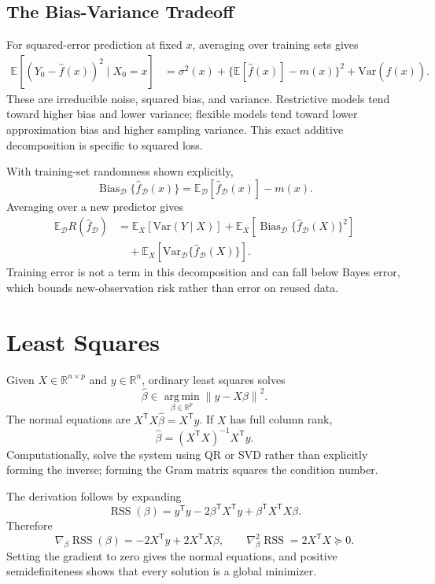 \documentclass[12pt,oneside]{book}
\numberwithin{equation}{section}
\theoremstyle{definition}
\theoremstyle{plain}
\theoremstyle{remark}
\newcommand{\R}{\mathbb{R}}
\newcommand{\E}{\mathbb{E}}
\newcommand{\Var}{\mathrm{Var}}
\newcommand{\argmin}{\operatorname*{arg\,min}}
\newcommand{\norm}[1]{\left\lVert #1 \right\rVert}
\newcommand{\grad}{\nabla}
\newcommand{\Hess}{\nabla^2}
\begin{document}
\subsection{The Bias-Variance Tradeoff}

For squared-error prediction at fixed $x$, averaging over training sets gives
\begin{align}
 \E[(Y_0-\widehat f(x))^2\mid X_0=x]
 &=\sigma^2(x)
 +\{\E[\widehat f(x)]-m(x)\}^2
 +\Var(\widehat f(x)).
 \label{eq:prediction-bias-variance}
\end{align}
These are irreducible noise, squared bias, and variance. Restrictive models
tend toward higher bias and lower variance; flexible models tend toward lower
approximation bias and higher sampling variance. This exact additive
decomposition is specific to squared loss.

With training-set randomness shown explicitly,
\[
 \operatorname{Bias}_{\mathcal D}\{\widehat f_{\mathcal D}(x)\}
 =\E_{\mathcal D}[\widehat f_{\mathcal D}(x)]-m(x).
\]
Averaging over a new predictor gives
\begin{align*}
 \E_{\mathcal D}R(\widehat f_{\mathcal D})
 &=\E_X[\Var(Y\mid X)]
 +\E_X[\operatorname{Bias}_{\mathcal D}
       \{\widehat f_{\mathcal D}(X)\}^2]\\
 &\quad+\E_X[\Var_{\mathcal D}
       \{\widehat f_{\mathcal D}(X)\}].
\end{align*}
Training error is not a term in this decomposition and can fall below Bayes
error, which bounds new-observation risk rather than error on reused data.

\section{Least Squares}

Given $X\in\R^{n\times p}$ and $y\in\R^n$, ordinary least squares solves
\begin{equation}
    \widehat\beta\in\argmin_{\beta\in\R^p}\norm{y-X\beta}^2.
    \label{eq:ols-objective}
\end{equation}
The normal equations are
$X^\mathsf TX\widehat\beta=X^\mathsf Ty$. If $X$ has full column rank,
\[
    \widehat\beta=(X^\mathsf TX)^{-1}X^\mathsf Ty.
\]
Computationally, solve the system using QR or SVD rather than explicitly
forming the inverse; forming the Gram matrix squares the condition number.

The derivation follows by expanding
\[
 \operatorname{RSS}(\beta)
 =y^\mathsf Ty-2\beta^\mathsf TX^\mathsf Ty
  +\beta^\mathsf TX^\mathsf TX\beta.
\]
Therefore
\[
 \grad_\beta\operatorname{RSS}(\beta)
 =-2X^\mathsf Ty+2X^\mathsf TX\beta,
 \qquad
 \Hess_\beta\operatorname{RSS}=2X^\mathsf TX\succeq0.
\]
Setting the gradient to zero gives the normal equations, and positive
semidefiniteness shows that every solution is a global minimizer.
\end{document}

